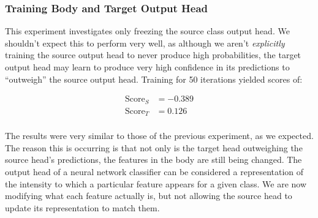\documentclass{report}
\newcommand{\SCORE}[2]{
	\begin{align*}
	\text{Score}_S &= #1 \\
	\text{Score}_T &= #2 \\
	\end{align*}
}
\begin{document}
	\subsubsection{Training Body and Target Output Head}
	This experiment investigates only freezing the source class output head. We shouldn't expect this to perform very well, as although we aren't \emph{explicitly} training the source output head to never produce high probabilities, the target output head may learn to produce very high confidence in its predictions to ``outweigh'' the source output head. Training for 50 iterations yielded scores of:
	\SCORE{-0.389}{0.126}
	The results were very similar to those of the previous experiment, as we expected. The reason this is occurring is that not only is the target head outweighing the source head's predictions, the features in the body are still being changed. The output head of a neural network classifier can be considered a representation of the intensity to which a particular feature appears for a given class. We are now modifying what each feature actually is, but not allowing the source head to update its representation to match them. \par
	
\end{document}
